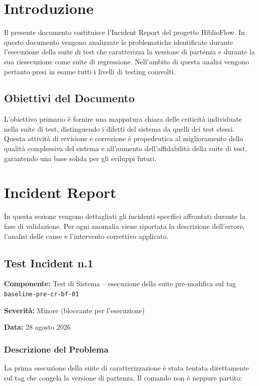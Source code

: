 \documentclass[11pt,a4paper,oneside,openany]{book}
\newcommand{\datiincidente}[3]{%
  \textbf{Componente:} #1\par
  \textbf{Severità:} #2\par
  \textbf{Data:} #3\par\medskip}
\begin{document}
\frontmatter
\copertina
\tableofcontents

\mainmatter
\chapter{Introduzione}

Il presente documento costituisce l'Incident Report del progetto BiblioFlow.
In questo documento vengono analizzate le problematiche identificate durante
l'esecuzione della suite di test che caratterizza la versione di partenza e
durante la sua riesecuzione come suite di regressione. Nell'ambito di questa
analisi vengono pertanto presi in esame tutti i livelli di testing coinvolti.

\section{Obiettivi del Documento}

L'obiettivo primario è fornire una mappatura chiara delle criticità
individuate nella suite di test, distinguendo i difetti del sistema da quelli
dei test stessi. Questa attività di revisione e correzione è propedeutica al
miglioramento della qualità complessiva del sistema e all'aumento
dell'affidabilità della suite di test, garantendo una base solida per gli
sviluppi futuri.

\chapter{Incident Report}

In questa sezione vengono dettagliati gli incidenti specifici affrontati
durante la fase di validazione. Per ogni anomalia viene riportata la
descrizione dell'errore, l'analisi delle cause e l'intervento correttivo
applicato.

\section{Test Incident n.1}

\datiincidente{Test di Sistema -- esecuzione della suite pre-modifica sul tag
\texttt{baseline-pre-cr-bf-01}}{Minore (bloccante per l'esecuzione)}{28 agosto 2026}

\subsection{Descrizione del Problema}

La prima esecuzione della suite di caratterizzazione è stata tentata
direttamente sul tag che congela la versione di partenza. Il comando non è
neppure partito:
\end{document}
